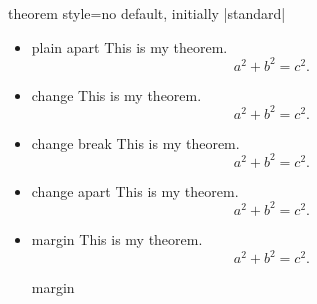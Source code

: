 \begin{docTcbKey}{theorem style}{=}{no default, initially |standard|}
\begin{itemize}
\begin{dispExample}
\begin{theorem}[theorem style=break]{break}{}
\end{theorem}
\end{dispExample}
%
\item{}
\begin{dispExample}
\begin{theorem}[theorem style=plain apart]{plain apart}{}
This is my theorem. \begin{equation*} a^2 + b^2 = c^2. \end{equation*}
\end{theorem}
\end{dispExample}
%
\item{}
\begin{dispExample}
\begin{theorem}[theorem style=change]{change}{}
This is my theorem. \begin{equation*} a^2 + b^2 = c^2. \end{equation*}
\end{theorem}
\end{dispExample}
%
\item{}
\begin{dispExample}
\begin{theorem}[theorem style=change break]{change break}{}
This is my theorem. \begin{equation*} a^2 + b^2 = c^2. \end{equation*}
\end{theorem}
\end{dispExample}
%
\item{}
\begin{dispExample}
\begin{theorem}[theorem style=change apart]{change apart}{}
This is my theorem. \begin{equation*} a^2 + b^2 = c^2. \end{equation*}
\end{theorem}
\end{dispExample}
%
\clearpage
\item{}
\begin{dispExample}
\begin{theorem}[theorem style=margin,left=10mm]{margin}{}
This is my theorem. \begin{equation*} a^2 + b^2 = c^2. \end{equation*}
\end{theorem}
\begin{theorem}[theorem style=margin,left=10mm,oversize]{margin}{}

\end{theorem}
\end{dispExample}
\end{itemize}
\end{docTcbKey}
